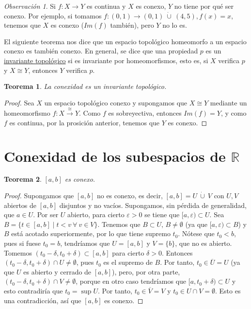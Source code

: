 \documentclass[12pt]{report}
\newtheorem{theorem}{Teorema}[chapter]
\theoremstyle{definition}
\theoremstyle{definition}
\theoremstyle{remark}
\newtheorem*{obs}{Observación} %
\newcommand{\R}{\mathbb R}
\begin{document}
\begin{obs}
Si $f \colon X \to Y$ es continua y $X$ es conexo, $Y$ no tiene por qué ser conexo. Por ejemplo, si tomamos $f \colon (0,1) \to (0,1) \ \dot\cup \ (4,5), f(x) = x$, tenemos que $X$ es conexo ($Im(f)$ también), pero $Y$ no lo es.
\end{obs}

\vspace{1mm}
El siguiente teorema nos dice que un espacio topológico homeomorfo a un espacio conexo es también conexo. En general, se dice que una propiedad $p$ es un \underline{invariante topológico} si es invariante por homeomorfismos, esto es, si $X$ verifica $p$ y $X \cong Y$, entonces $Y$ verifica $p$.

\begin{theorem}
La conexidad es un invariante topológico.
\end{theorem}

\begin{proof}
Sea $X$ un espacio topológico conexo y supongamos que $X \cong Y$ mediante un homeomorfismo $f \colon X \xrightarrow{\cong} Y$. Como $f$ es sobreyectiva, entonces $Im(f) = Y$, y como $f$ es continua, por la prosición anterior, tenemos que $Y$ es conexo.
\end{proof}

\section{Conexidad de los subespacios de $\R$}

\begin{theorem}
$[a,b]$ es conexo.
\end{theorem}

\begin{proof}
Supongamos que $[a,b]$ no es conexo, es decir, $[a,b] = U \ \dot\cup \ V$ con $U,V$ abiertos de $[a,b]$ disjuntos y no vacíos. Supongamos, sin pérdida de generalidad, que $a \in U$. Por ser $U$ abierto, para cierto $\varepsilon > 0$ se tiene que $[a,\varepsilon) \subset U$. Sea $B = \{t \in [a,b] \mid  t < v \ \forall \ v \in V\}$. Tenemos que $B \subset U$, $B \neq \emptyset$ (ya que $[a,\varepsilon) \subset B$) y $B$ está acotado superiormente, por lo que tiene supremo $t_0$. Nótese que $t_0 < b$, pues si fuese $t_0 = b$, tendríamos que $U = [a,b]$ y $V = \{b\}$, que no es abierto. Tomemos $(t_0 - \delta, t_0 + \delta) \subset [a,b]$ para cierto $\delta > 0$. Entonces $(t_0 - \delta, t_0 + \delta) \cap U \neq \emptyset$, pues $t_0$ es el supremo de $B$. Por tanto, $t_0 \in \overline{U} = U$ (ya que $U$ es abierto y cerrado de $[a,b]$), pero, por otra parte, $(t_0 - \delta, t_0 + \delta) \cap V \neq \emptyset$, porque en otro caso tendríamos que $[a,t_0+\delta) \subset U$ y esto contradiría que $t_0 = \sup{U}$. Por tanto, $t_0 \in \overline{V} = V$ y $t_0 \in U \cap V = \emptyset$. Esto es una contradicción, así que $[a,b]$ es conexo.
\end{proof}
\end{document}
